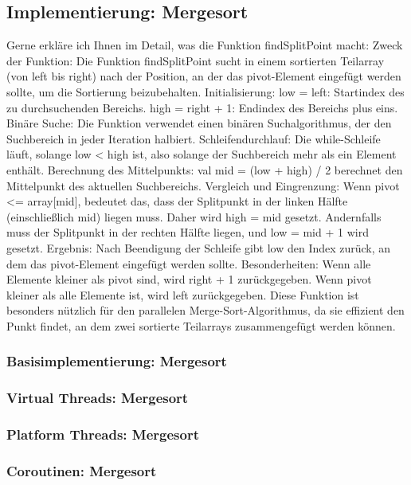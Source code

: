 \documentclass[fontsize=12pt,paper=a4,twoside=semi,parskip=half-,headsepline,headinclude]{scrreprt}
\begin{document}
\subsection{Implementierung: Mergesort}

Gerne erkläre ich Ihnen im Detail, was die Funktion findSplitPoint macht:
Zweck der Funktion:
Die Funktion findSplitPoint sucht in einem sortierten Teilarray (von left bis right) nach der Position, an der das pivot-Element eingefügt werden sollte, um die Sortierung beizubehalten.
Initialisierung:
low = left: Startindex des zu durchsuchenden Bereichs.
high = right + 1: Endindex des Bereichs plus eins.
Binäre Suche:
Die Funktion verwendet einen binären Suchalgorithmus, der den Suchbereich in jeder Iteration halbiert.
Schleifendurchlauf:
Die while-Schleife läuft, solange low < high ist, also solange der Suchbereich mehr als ein Element enthält.
Berechnung des Mittelpunkts:
val mid = (low + high) / 2 berechnet den Mittelpunkt des aktuellen Suchbereichs.
Vergleich und Eingrenzung:
Wenn pivot <= array[mid], bedeutet das, dass der Splitpunkt in der linken Hälfte (einschließlich mid) liegen muss. Daher wird high = mid gesetzt.
Andernfalls muss der Splitpunkt in der rechten Hälfte liegen, und low = mid + 1 wird gesetzt.
Ergebnis:
Nach Beendigung der Schleife gibt low den Index zurück, an dem das pivot-Element eingefügt werden sollte.
Besonderheiten:
Wenn alle Elemente kleiner als pivot sind, wird right + 1 zurückgegeben.
Wenn pivot kleiner als alle Elemente ist, wird left zurückgegeben.
Diese Funktion ist besonders nützlich für den parallelen Merge-Sort-Algorithmus, da sie effizient den Punkt findet, an dem zwei sortierte Teilarrays zusammengefügt werden können.

\subsubsection{Basisimplementierung: Mergesort}

\subsubsection{Virtual Threads: Mergesort}

\subsubsection{Platform Threads: Mergesort}

\subsubsection{Coroutinen: Mergesort}
\end{document}
